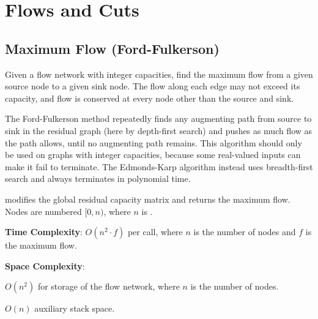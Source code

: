 \section{\texorpdfstring{Flows and Cuts}{4.5 Flows and Cuts}}
\setcounter{section}{5}
\setcounter{subsection}{0}
\subsection{Maximum Flow (Ford-Fulkerson)}
\label{sec:4.5.1}
Given a flow network with integer capacities, find the maximum flow from a given source node to a given sink node. The flow along each edge may not exceed its capacity, and flow is conserved at every node other than the source and sink.

The Ford-Fulkerson method repeatedly finds any augmenting path from source to sink in the residual graph (here by depth-first search) and pushes as much flow as the path allows, until no augmenting path remains. This algorithm should only be used on graphs with integer capacities, because some real-valued inputs can make it fail to terminate. The Edmonds-Karp algorithm instead uses breadth-first search and always terminates in polynomial time.

\begin{compactitem}
  \item {} modifies the global residual capacity matrix  and returns the maximum flow. Nodes are numbered $[0, n)$, where $n$ is .
\end{compactitem}

\textbf{Time Complexity}: $O(n^{2} \cdot f)$ per call, where $n$ is the number of nodes and $f$ is the maximum flow.

\textbf{Space Complexity}:
\begin{compactitem}
  \item $O(n^{2})$ for storage of the flow network, where $n$ is the number of nodes.
  \item $O(n)$ auxiliary stack space.
\end{compactitem}


